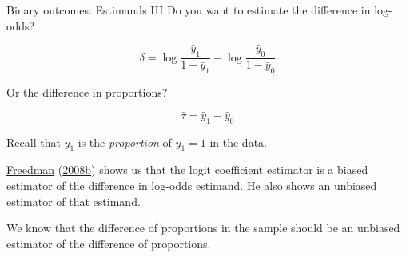 \documentclass[
  ignorenonframetext,
]{beamer}
\begin{document}
\begin{frame}{Binary outcomes: Estimands III}
\protect\hypertarget{binary-outcomes-estimands-iii}{}
Do you want to estimate the difference in log-odds?

\begin{equation}
\delta = \log \frac{\bar{y}_{1}}{1-\bar{y}_{1}} - \log \frac{ \bar{y}_0}{1- \bar{y}_0}
\end{equation}

Or the difference in proportions?

\begin{equation}
\bar{\tau} = \bar{y}_{1} - \bar{y}_0
\end{equation}

Recall that \(\bar{y}_1\) is the \emph{proportion} of \(y_{1}=1\) in the
data.

\protect\hyperlink{ref-freedman2008randomization}{Freedman}
(\protect\hyperlink{ref-freedman2008randomization}{2008b}) shows us that
the logit coefficient estimator is a biased estimator of the difference
in log-odds estimand. He also shows an unbiased estimator of that
estimand.

We know that the difference of proportions in the sample should be an
unbiased estimator of the difference of proportions.
\end{frame}
\end{document}
